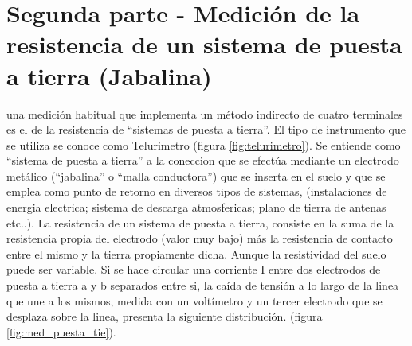 \documentclass[12pt, letterpaper]{article}
\begin{document}
\section{Segunda parte - Medición de la resistencia de un sistema de puesta a tierra (Jabalina)}
una medición habitual que implementa un método indirecto de cuatro terminales es el de la resistencia de “sistemas de puesta a tierra”. El tipo de
instrumento que se utiliza se conoce como Telurimetro (figura \ref{fig:telurimetro}). Se entiende como “sistema de puesta a tierra” a la coneccion que se efectúa
mediante un electrodo metálico (“jabalina” o “malla conductora”) que se inserta en el suelo y
que se emplea como punto de retorno en diversos tipos de sistemas, (instalaciones de energia
electrica; sistema de descarga atmosfericas; plano de tierra de antenas etc..).
La resistencia de un sistema de puesta a tierra, consiste en la suma de la resistencia propia del
electrodo (valor muy bajo) más la resistencia de contacto entre
el mismo y la tierra propiamente dicha. Aunque la resistividad del suelo puede ser variable.
Si se hace circular una corriente I entre dos electrodos de puesta a tierra a y b separados entre si, la caída de tensión a lo largo de la linea que une a los mismos, medida con un
voltímetro y un tercer electrodo que se desplaza sobre la linea, presenta la
siguiente distribución. (figura \ref{fig:med_puesta_tie}).
\end{document}
